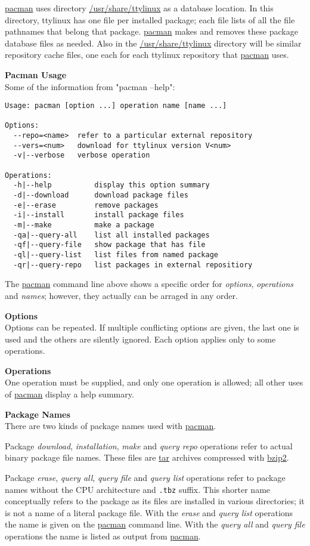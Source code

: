 \documentclass[10pt]{article}
\begin{document}
\url{pacman} uses directory \url{/usr/share/ttylinux} as a database location.
In this directory, ttylinux has one file per installed package; each file
lists of all the file pathnames that belong that package. \url{pacman} makes
and removes these package database files as needed. Also in the
\url{/usr/share/ttylinux} directory will be similar repository cache files, one
each for each ttylinux repository that \url{pacman} uses.

{\bf Pacman Usage}\\
Some of the information from "pacman --help":
\begin{lstlisting}
Usage: pacman [option ...] operation name [name ...]

Options:
  --repo=<name>  refer to a particular external repository
  --vers=<num>   download for ttylinux version V<num>
  -v|--verbose   verbose operation

Operations:
  -h|--help          display this option summary
  -d|--download      download package files
  -e|--erase         remove packages
  -i|--install       install package files
  -m|--make          make a package
  -qa|--query-all    list all installed packages
  -qf|--query-file   show package that has file
  -ql|--query-list   list files from named package
  -qr|--query-repo   list packages in external repositiory
\end{lstlisting}

The \url{pacman} command line above shows a specific order for {\it options},
{\it operations} and {\it names}; however, they actually can be arraged in any
order.

{\bf Options}\\
Options can be repeated. If multiple conflicting options are given, the last
one is used and the others are silently ignored. Each option applies only to
some operations.

{\bf Operations}\\
One operation must be supplied, and only one operation is allowed; all other
uses of \url{pacman} display a help summary.

{\bf Package Names}\\
There are two kinds of package names used with \url{pacman}.

Package {\it download}, {\it installation}, {\it make} and
{\it query repo} operations refer to actual binary package file names.
These files are \url{tar} archives compressed with \url{bzip2}.

Package {\it erase}, {\it query all}, {\it query file} and {\it query list}
operations refer to package names without the CPU architecture and {\tt .tbz}
suffix. This shorter name conceptually refers to the package as its files are
installed in various directories; it is not a name of a literal package file.
With the {\it erase} and {\it query list} operations the name is given on the
\url{pacman} command line. With the {\it query all} and {\it query file}
operations the name is listed as output from \url{pacman}.
\end{document}
